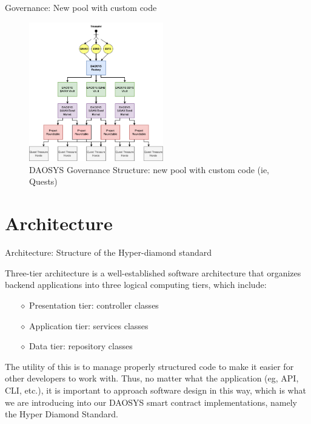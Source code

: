 \documentclass[10pt,xcolor=svgnames]{beamer} %
\begin{document}
\begin{frame}{Governance:  New pool with custom code} 

\begin{figure}[h!]
\includegraphics[width=2.3in]{img/governance.png}
\caption{DAOSYS Governance Structure: new pool with custom code (ie, Quests)} 
\label{fig:daosys_governance}
\end{figure}

\end{frame}

\section{Architecture}

\begin{frame}{Architecture: Structure of the Hyper-diamond standard}

Three-tier architecture is a well-established software architecture that organizes backend applications into three logical computing tiers, which include:

\begin{itemize}
  \item[$\diamond$] Presentation tier: controller classes
  \item[$\diamond$] Application tier: services classes
  \item[$\diamond$] Data tier: repository classes
\end{itemize} 

The utility of this is to manage properly structured code to make it easier for other developers to work with. Thus, no matter what the application (eg, API, CLI, etc.), it is important to approach software design in this way, which is what we are introducing into our DAOSYS smart contract implementations, namely the Hyper Diamond Standard.

\end{frame}
\end{document}
